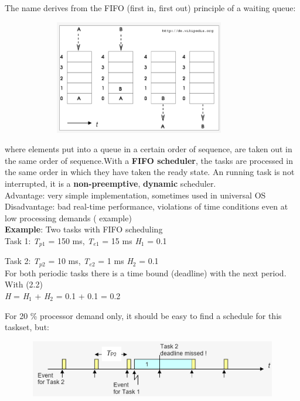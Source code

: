 The name derives from the FIFO (first in, first out) principle of a waiting queue:    

 	\begin{figure}[h]
    \centering
    \includegraphics[width=10cm, height=5cm]{Images/image97.png}
    \label{fig:Fig }
    \end{figure}

where elements put into a queue in a certain order of sequence, are taken out in the same order of sequence.With a \textbf{FIFO scheduler}, the tasks are processed in the same order in which they have taken the ready state.  An running task is not interrupted, it is a \textbf{non-preemptive}, \textbf{dynamic} scheduler.\\

Advantage:   very simple implementation, sometimes used in universal OS\\

Disadvantage:  bad real-time performance,        violations of time conditions even at low processing demands ( example)\\

\textbf{Example}: Two tasks with FIFO scheduling\\

Task 1: \textit{T}${}_{p1}$ = 150 ms, \textit{T}${}_{e1}$ = 15 ms   \textit{H}${}_{1}$ = 0.1

Task 2: \textit{T}${}_{p2}$ = 10 ms,  \textit{T}${}_{e2}$ = 1 ms    \textit{H}${}_{2}$ = 0.1\\

For both periodic tasks there is a time bound (deadline) with the next period. With (2.2) \\

\textit{H} = \textit{H}${}_{1}$ + \textit{H}${}_{2}$ = 0.1 + 0.1 = 0.2 

For 20 \% processor demand only, it should be easy to find a schedule for this taskset, but:

 	\begin{figure}[h]
    \centering
    \includegraphics[width=12cm, height=2.5cm]{Images/image98.png}
    \label{fig:Fig }
    \end{figure}

